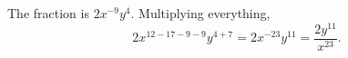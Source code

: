 The fraction is $2x^{-9}y^{4}$. Multiplying everything,
\[
2x^{12-17-9-9}y^{4+7}=2x^{-23}y^{11}=\boxed{\dfrac{2y^{11}}{x^{23}}}.
\]

